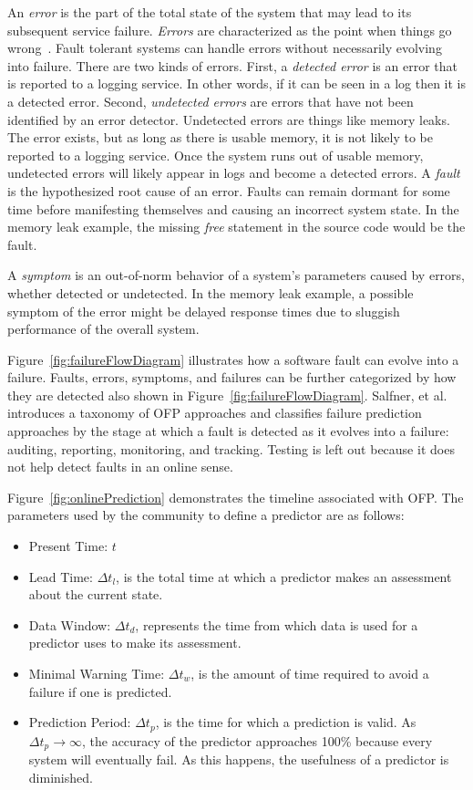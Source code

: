 An \emph{error} is the part of the total state of the system that may lead to
its subsequent service failure.  \emph{Errors} are characterized as the point
when things go wrong~\cite{salfnerSurvey}.  Fault tolerant systems can handle
errors without necessarily evolving into failure.  There are two kinds of
errors.  First, a \emph{detected error} is an error that is reported to a
logging service.  In other words, if it can be seen in a log then it is a
detected error.  Second, \emph{undetected errors} are errors that have not been
identified by an error detector.  Undetected errors are things like memory
leaks.  The error exists, but as long as there is usable memory, it is not
likely to be reported to a logging service.  Once the system runs out of usable
memory, undetected errors will likely appear in logs and become a detected
errors.  A \emph{fault} is the hypothesized root cause of an error.  Faults can
remain dormant for some time before manifesting themselves and causing an
incorrect system state.  In the memory leak example, the missing \emph{free}
statement in the source code would be the fault.  

A \emph{symptom} is an out-of-norm behavior of a system's parameters caused by
errors, whether detected or undetected.  In the memory leak example, a possible
symptom of the error might be delayed response times due to sluggish
performance of the overall system.

\figfailureFlowDiagram{6in}

Figure~\ref{fig:failureFlowDiagram} illustrates how a software fault can evolve
into a failure.  Faults, errors, symptoms, and failures can be further
categorized by how they are detected also shown in
Figure~\ref{fig:failureFlowDiagram}.  Salfner, et al.~\cite{salfnerSurvey}
introduces a taxonomy of OFP approaches and classifies failure prediction
approaches by the stage at which a fault is detected as it evolves into a
failure: auditing, reporting, monitoring, and tracking.  Testing is left out
because it does not help detect faults in an online sense.  

\figonlinePrediction{6in}

Figure~\ref{fig:onlinePrediction} demonstrates the timeline associated with
OFP.  The parameters used by the community to define a predictor are as
follows:
\begin{itemize}
	\item{Present Time: $t$}
  \item{Lead Time: $\Delta t_{l}$, is the total time at which a predictor makes
  an assessment about the current state.}
  \item{Data Window: $\Delta t_{d}$, represents the time from which data is
  used for a predictor uses to make its assessment.}
  \item{Minimal Warning Time: $\Delta t_{w}$, is the amount of time required to
  avoid a failure if one is predicted.}
  \item{Prediction Period: $\Delta t_{p}$, is the time for which a prediction
  is valid.  As $\Delta t_{p} \rightarrow \infty$, the accuracy of the
  predictor approaches 100\% because every system will eventually fail.  As
  this happens, the usefulness of a predictor is diminished.}
\end{itemize}


